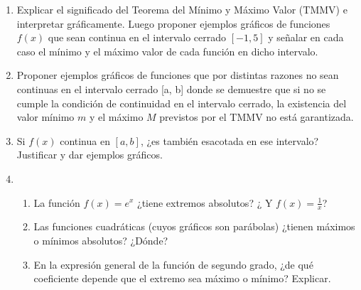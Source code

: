 \documentclass[12pt]{article}
\newtheorem*{myteo}{Teorema} %
\theoremstyle{definition}
\newtheorem*{mydef}{Definición}
\begin{document}
\begin{enumerate}
\vspace{0.3 cm}

\item  Explicar el significado del Teorema del  Mínimo y Máximo Valor (TMMV) e interpretar gráficamente. Luego proponer ejemplos gráficos de funciones $f(x)$ que sean continua en el intervalo cerrado $[-1,5]$ y señalar en cada caso el mínimo y el máximo valor de cada función en dicho intervalo.

\item Proponer ejemplos gráficos de funciones que por distintas razones no sean continuas en el intervalo cerrado [a, b] donde se demuestre que si no se cumple la condición de continuidad en el intervalo cerrado, la existencia del valor mínimo $m$ y el máximo $M$ previstos por el TMMV no está garantizada.

\item Si $f(x)$ continua en $[a, b]$, ¿es también esacotada en ese intervalo? Justificar y dar ejemplos gráficos.


\item 
\begin{enumerate}
\item La función $f(x) = e^{x}$ ¿tiene extremos absolutos? ¿ Y $f(x) = \frac{1}{x}$?
\item Las funciones cuadráticas (cuyos gráficos son parábolas) ¿tienen máximos o mínimos absolutos? ¿Dónde? 
\item En la expresión general de la función de segundo grado, ¿de qué coeficiente depende que el extremo sea máximo o mínimo? Explicar.
\end{enumerate}
\vspace{0.3 cm} 



\end{enumerate}
\end{document}
